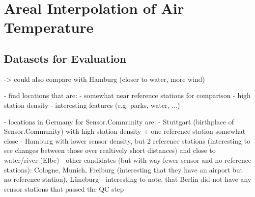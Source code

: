 \section{Areal Interpolation of Air Temperature}

\subsection{Datasets for Evaluation}

-> could also compare with Hamburg (closer to water, more wind)

- find locations that are:
  - somewhat near reference stations for comparison
  - high station density
  - interesting features (e.g. parks, water, ...)

- locations in Germany for Sensor.Community are:
  - Stuttgart (birthplace of Sensor.Community) with high station density + one reference station somewhat close
  - Hamburg with lower sensor density, but 2 reference stations (interesting to see changes between those over realtively short distances) and close to water/river (Elbe)
  - other candidates (but with way fewer sensor and no reference stations): Cologne, Munich, Freiburg (interesting that they have an airport but no reference station), Lüneburg
  - interesting to note, that Berlin did not have any sensor stations that passed the QC step\\


